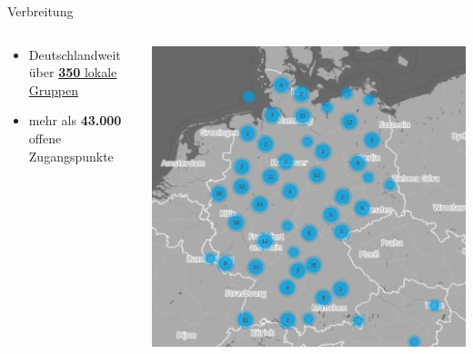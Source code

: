 \documentclass[t]{beamer}
\begin{document}
  \begin{frame}{Verbreitung}
    \begin{columns}
      \begin{column}{0.6\textwidth}
        \begin{itemize}
          \item Deutschlandweit über  \href{http://freifunk.net/wie-mache-ich-mit/community-finden/}{\textbf{350} lokale Gruppen}
          \item mehr als \textbf{43.000} offene Zugangspunkte
        \end{itemize}
      \end{column}
      \begin{column}{0.4\textwidth}
        \begin{center}
          \includegraphics[width=\textwidth]{images/2016-06-01_map-de}
        \end{center}
      \end{column}
    \end{columns}
  \end{frame}
\end{document}
